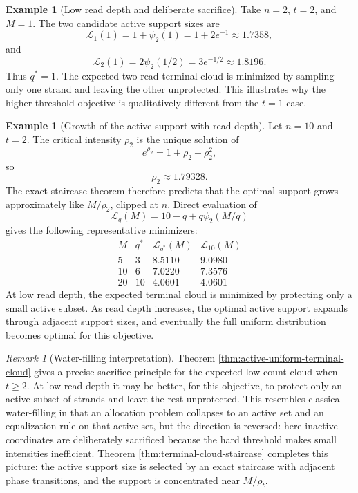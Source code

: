 \documentclass[11pt]{article}
\theoremstyle{definition}
\newtheorem{example}[theorem]{Example}
\theoremstyle{remark}
\newtheorem{remark}[theorem]{Remark}
\newcommand{\1}{\mathbf 1}
\begin{document}
\begin{example}[Low read depth and deliberate sacrifice]
Take \(n=2\), \(t=2\), and \(M=1\).  The two candidate active support sizes are
\[
  \mathcal L_1(1)=1+\psi_2(1)=1+2e^{-1}\approx1.7358,
\]
and
\[
  \mathcal L_2(1)=2\psi_2(1/2)=3e^{-1/2}\approx1.8196.
\]
Thus \(q^*=1\).  The expected two-read terminal cloud is minimized by sampling only one strand and leaving the other unprotected.  This illustrates why the higher-threshold objective is qualitatively different from the \(t=1\) case.
\end{example}

\begin{example}[Growth of the active support with read depth]
Let \(n=10\) and \(t=2\).  The critical intensity \(\rho_2\) is the unique solution of
\[
  e^{\rho_2}=1+\rho_2+\rho_2^2,
\]
so
\[
  \rho_2\approx1.79328.
\]
The exact staircase theorem therefore predicts that the optimal support grows approximately like \(M/\rho_2\), clipped at \(n\).  Direct evaluation of
\[
  \mathcal L_q(M)=10-q+q\psi_2(M/q)
\]
gives the following representative minimizers:
\[
\begin{array}{c|c|c|c}
M & q^* & \mathcal L_{q^*}(M) & \mathcal L_{10}(M)\\
\hline
5  & 3  & 8.5110 & 9.0980\\
10 & 6  & 7.0220 & 7.3576\\
20 & 10 & 4.0601 & 4.0601
\end{array}
\]
At low read depth, the expected terminal cloud is minimized by protecting only a small active subset.  As read depth increases, the optimal active support expands through adjacent support sizes, and eventually the full uniform distribution becomes optimal for this objective.
\end{example}

\begin{remark}[Water-filling interpretation]
Theorem \ref{thm:active-uniform-terminal-cloud} gives a precise sacrifice principle for the expected low-count cloud when \(t\ge2\).  At low read depth it may be better, for this objective, to protect only an active subset of strands and leave the rest unprotected.  This resembles classical water-filling in that an allocation problem collapses to an active set and an equalization rule on that active set, but the direction is reversed: here inactive coordinates are deliberately sacrificed because the hard threshold makes small intensities inefficient.  Theorem \ref{thm:terminal-cloud-staircase} completes this picture: the active support size is selected by an exact staircase with adjacent phase transitions, and the support is concentrated near \(M/\rho_t\).
\end{remark}
\end{document}
